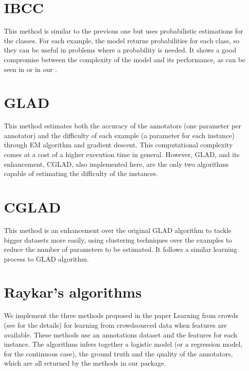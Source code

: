 \documentclass[letterpaper,10pt,english]{sphinxmanual}
\begin{document}
\section{IBCC}
\label{\detokenize{package/methods:id4}}
This method is similar to the previous one but uses probabilistic estimations for the classes. For each example,
the model returns probabilities for each class, so they can be useful in problems where a probability is needed.
It shows a good compromise between the complexity of the model and its performance, as can be seen in  
or in our {\hyperref[\detokenize{package/other:comparison-with-other-packages}]{}}.


\section{GLAD}
\label{\detokenize{package/methods:id5}}
This method estimates both the accuracy of the annotators (one parameter per annotator) and the difficulty
of each example (a parameter for each instance) through EM algorithm and gradient descent. This computational complexity
comes at a cost of a higher execution time in general. However, GLAD, and its enhancement, CGLAD, also implemented here, are the only two algorithms 
capable of estimating the difficulty of the instances.


\section{CGLAD}
\label{\detokenize{package/methods:id6}}
This method is an enhancement over the original GLAD algorithm to tackle bigger datasets more easily, using
clustering techniques over the examples to reduce the number of parameters to be estimated. It follows a similar
learning process to GLAD algorithm.


\section{Raykar’s algorithms}
\label{\detokenize{package/methods:raykar-s-algorithms}}
We implement the three methods proposed in the paper Learning from crowds 
(see  for the details) 
for learning
from crowdsourced data when features are available. These methods use an annotations dataset and the 
features for each instance. The algorithms infers together a logistic
model (or a regression model, for the continuous case), the ground truth
and the quality of the annotators, which are all returned by the methods in our package.
\end{document}
